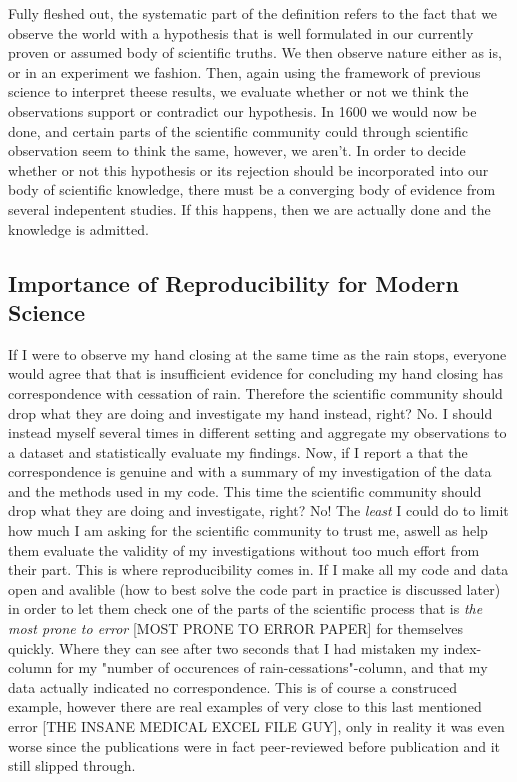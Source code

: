 \documentclass[nofootinbib,UKenglish,nobalancelastpage,12pt]{article}
\begin{document}
Fully fleshed out, the systematic part of the definition refers to the fact that we observe the world with a hypothesis that is well formulated in our currently proven or assumed body of scientific truths. We then observe nature either as is, or in an experiment we fashion. Then, again using the framework of previous science to interpret theese results, we evaluate whether or not we think the observations support or contradict our hypothesis. In 1600 we would now be done, and certain parts of the scientific community could through scientific observation seem to think the same, however, we aren't. In order to decide whether or not this hypothesis or its rejection should be incorporated into our body of scientific knowledge, there must be a converging body of evidence from several indepentent studies. If this happens, then we are actually done and the knowledge is admitted.

\subsection{Importance of Reproducibility for Modern Science}

If I were to observe my hand closing at the same time as the rain stops, everyone would agree that that is insufficient evidence for concluding my hand closing has correspondence with cessation of rain. Therefore the scientific community should drop what they are doing and investigate my hand instead, right? No. I should instead myself several times in different setting and aggregate my observations to a dataset and statistically evaluate my findings. Now, if I report a that the correspondence is genuine and with a summary of my investigation of the data and the methods used in my code. This time the scientific community should drop what they are doing and investigate, right? No! The \textit{least} I could do to limit how much I am asking for the scientific community to trust me, aswell as help them evaluate the validity of my investigations without too much effort from their part. This is where reproducibility comes in. If I make all my code and data open and avalible (how to best solve the code part in practice is discussed later) in order to let them check one of the parts of the scientific process that is \textit{the most prone to error} [MOST PRONE TO ERROR PAPER] for themselves quickly. Where they can see after two seconds that I had mistaken my index-column for my "number of occurences of rain-cessations"-column, and that my data actually indicated no correspondence. This is of course a construced example, however there are real examples of very close to this last mentioned error [THE INSANE MEDICAL EXCEL FILE GUY], only in reality it was even worse since the publications were in fact peer-reviewed before publication and it still slipped through.
\end{document}
